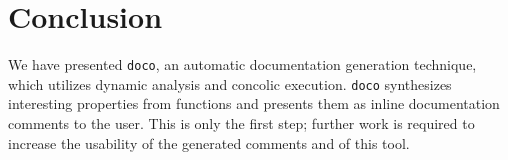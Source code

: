 \section{Conclusion}

We have presented \texttt{doco}, an automatic documentation generation technique, which utilizes dynamic analysis and concolic execution. \texttt{doco} synthesizes interesting properties from functions and presents them as inline documentation comments to the user. This is only the first step; further work is required to increase the usability of the generated comments and of this tool.
